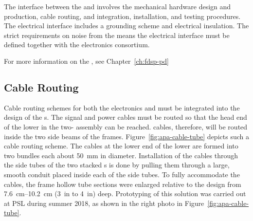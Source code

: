 The interface between the  and  involves the mechanical hardware design and production, cable routing, and integration, installation, and testing procedures. %
The electrical interface includes a grounding scheme and electrical insulation. The strict requirements on noise from the  means the electrical interface must be defined together with the  electronics consortium. 

For more information on the , see Chapter~\ref{ch:fdsp-pd} %



\subsection{Cable Routing}
\label{sec:fdsp-apa-intfc-cables}

Cable routing schemes for both the  electronics and  must be integrated into the design of the s.   The  signal and power cables must be routed so that the head end of the lower  in the two- assembly can be reached.  cables, therefore, will be routed inside the two side beams of the  frames. Figure~\ref{fig:apa-cable-tube} depicts such a cable routing scheme.  The  cables at the lower end of the lower  are formed into two bundles each about \SI{50}{mm} in diameter. Installation of the cables through the side tubes of the two stacked s is done by pulling them through a large, smooth conduit placed inside each of the side tubes.  To fully accommodate the cables, the  frame hollow tube sections were enlarged relative to the  design from \SIrange{7.6}{10.2}{cm} (\SI{3}{in} to \SI{4}{in}) deep. Prototyping of this solution was carried out at PSL during summer 2018, as shown in the right photo in Figure~\ref{fig:apa-cable-tube}.     



